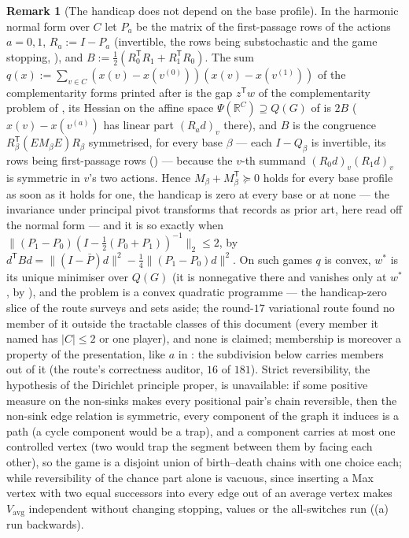 \documentclass[11pt]{article}
\theoremstyle{plain}
\theoremstyle{definition}
\newtheorem{remark}[theorem]{Remark}
\newcommand{\Vavg}{V_{\mathrm{avg}}}
\begin{document}
\begin{remark}[The handicap does not depend on the base profile]\label{rem:handicap-base}
In the harmonic normal form over $C$ let $P_a$ be the matrix of the
first-passage rows of the actions $a=0,1$, $R_a:=I-P_a$ (invertible, the
rows being substochastic and the game stopping,
), and $B:=\tfrac12(R_0^{\mathsf T}R_1+R_1^{\mathsf T}R_0)$.
The sum $q(x):=\sum_{v\in C}(x(v)-x(v^{(0)}))(x(v)-x(v^{(1)}))$ of the
complementarity forms printed after  is the
gap $z^{\mathsf T}w$ of the complementarity problem of , its
Hessian on the affine space $\Psi(\mathbb R^{C})\supseteq Q(G)$ of
 is $2B$ ($x(v)-x(v^{(a)})$ has linear part
$(R_ad)_v$ there), and $B$ is the congruence
$R_\beta^{\mathsf T}(EM_\beta E)R_\beta$ symmetrised, for every base
$\beta$ --- each $I-Q_\beta$ is invertible, its rows being first-passage
rows () --- because the $v$-th summand
$(R_0d)_v(R_1d)_v$ is symmetric in $v$'s two actions. Hence $M_\beta+M_\beta^{\mathsf T}\succeq0$ holds for
every base profile as soon as it holds for one, the handicap is zero at
every base or at none --- the invariance under principal pivot transforms
that  records as prior art, here read off the normal form
--- and it is so exactly when
$\|(P_1-P_0)(I-\tfrac12(P_0+P_1))^{-1}\|_2\le2$, by
$d^{\mathsf T}Bd=\|(I-\bar P)d\|^{2}-\tfrac14\|(P_1-P_0)d\|^{2}$. On such
games $q$ is convex, $w^\ast$ is its unique minimiser over $Q(G)$ (it is
nonnegative there and vanishes only at $w^\ast$, by
), and the problem is a convex quadratic
programme --- the handicap-zero slice of the route  surveys
and sets aside; the round-$17$ variational route found no member of it
outside the tractable classes of this document (every member it named has
$|C|\le2$ or one player), and none is claimed; membership is moreover a
property of the presentation, like $a$ in : the
subdivision below carries members out of it (the route's correctness
auditor, $16$ of $181$). Strict reversibility, the
hypothesis of the Dirichlet principle proper, is unavailable: if some
positive measure on the non-sinks makes every positional pair's chain
reversible, then the non-sink edge relation is symmetric, every component
of the graph it induces is a path (a cycle component would be a trap),
and a component carries at most one controlled vertex (two would trap
the segment between them by facing each other), so the game is a disjoint
union of birth--death chains with one choice each; while reversibility of
the chance part alone is vacuous, since inserting a Max vertex with two
equal successors into every edge out of an average vertex makes $\Vavg$
independent without changing stopping, values or the all-switches run
((a) run backwards).
\end{remark}
\end{document}
